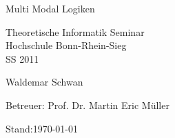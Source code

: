 
\begin{titlepage}
	
	\vspace*{2cm}
	
	\begin{center}
		\begin{Huge}
			Multi Modal Logiken
		\end{Huge}
	\end{center}
	
	\vspace*{2cm}
	
	\begin{center}
		\begin{Large}
			Theoretische Informatik Seminar\\
			Hochschule Bonn-Rhein-Sieg\\
			SS 2011
		\end{Large}			
	\end{center}

	\vspace*{4cm}
	
	\begin{center}
		\begin{Large}
			Waldemar Schwan 
		\end{Large}			
	\end{center}
	
	\vspace*{5cm}
	
	
	
	
	\begin{large}
		Betreuer: Prof. Dr. Martin Eric Müller 
	\end{large}
	
	\vspace*{1cm}
	Stand:\today
\end{titlepage}